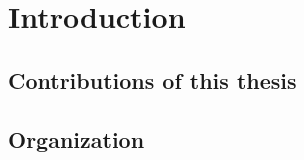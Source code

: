\chapter{Introduction}
\label{ch:intro}

\section{Contributions of this thesis}

\section{Organization}
